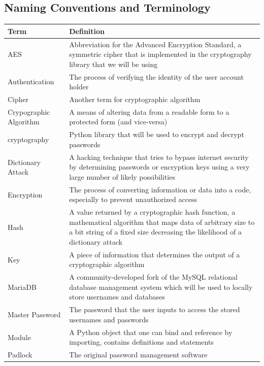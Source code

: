 \documentclass[12pt, titlepage]{article}
\begin{document}
\subsection{Naming Conventions and Terminology}
\begin{table}
\begin{center}
\begin{tabular}{ | p{3cm} | p{10cm} | }
	\hline
	Term & Definition \\
	\hline
	AES & Abbreviation for the Advanced Encryption Standard, a symmetric cipher that is implemented in the cryptography library that we will be using \\
	\hline
	Authentication & The process of verifying the identity of the user account holder  \\
	\hline
	Cipher & Another term for cryptographic algorithm \\
	\hline
	Crypographic Algorithm & A means of altering data from a readable form to a protected form (and vice-versa) \\
	\hline
	cryptography & Python library that will be used to encrypt and decrypt passwords \\
	\hline
	Dictionary Attack & A hacking technique that tries to bypass internet security by determining passwords or encryption keys using a very large number of likely possibilities \\
	\hline
	Encryption & The process of converting information or data into a code, especially to prevent unauthorized access \\
	\hline
	Hash & A value returned by a cryptographic hash function, a mathematical algorithm that maps data of arbitrary size to a bit string of a fixed size decreasing the likelihood of a dictionary attack \\
	\hline
	Key & A piece of information that determines the output of a cryptographic algorithm \\
	\hline
	MariaDB & A community-developed fork of the MySQL relational database management system which will be used to locally store usernames and databases \\
	\hline
	Master Password & The password that the user inputs to access the stored usernames and passwords \\
	\hline
	Module & A Python object that one can bind and reference by importing, contains definitions and statements \\
	\hline
	Padlock & The original password management software \\

\end{tabular}
\end{center}
\end{table}
\end{document}
